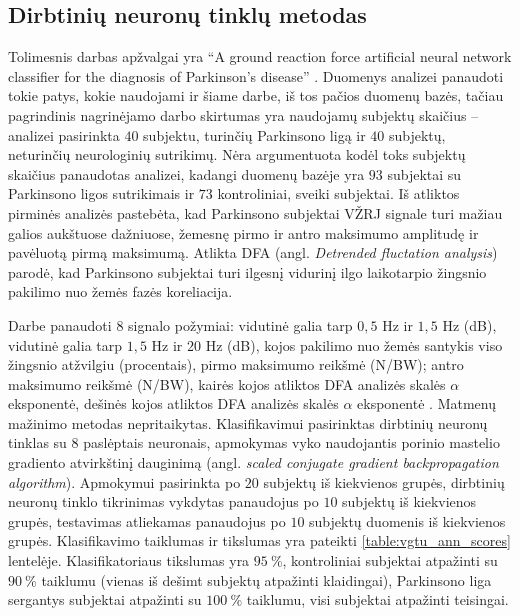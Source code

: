 \documentclass[]{vgtuef}
\begin{document}
\subsection{Dirbtinių neuronų tinklų metodas}


Tolimesnis darbas apžvalgai yra ``A ground reaction force artificial neural network classifier for the diagnosis of Parkinson's disease'' \cite{vgtu}. Duomenys analizei panaudoti tokie patys, kokie naudojami ir šiame darbe, iš tos pačios duomenų bazės, tačiau pagrindinis nagrinėjamo darbo skirtumas yra naudojamų subjektų skaičius -- analizei pasirinkta $40$ subjektu, turinčių Parkinsono ligą ir $40$ subjektų, neturinčių neurologinių sutrikimų. Nėra argumentuota kodėl toks subjektų skaičius panaudotas analizei, kadangi duomenų bazėje yra $93$ subjektai su Parkinsono ligos sutrikimais ir $73$ kontroliniai, sveiki subjektai. Iš atliktos pirminės analizės pastebėta, kad Parkinsono subjektai VŽRJ signale turi mažiau galios aukštuose dažniuose, žemesnę pirmo ir antro maksimumo amplitudę ir pavėluotą pirmą maksimumą. Atlikta DFA (angl. \textit{Detrended fluctation analysis}) parodė, kad Parkinsono subjektai turi ilgesnį vidurinį ilgo laikotarpio žingsnio pakilimo nuo žemės fazės koreliacija.

Darbe panaudoti $8$ signalo požymiai: vidutinė galia tarp $0,5$ Hz ir $1,5$ Hz (dB), vidutinė galia tarp $1,5$ Hz ir $20$ Hz (dB), kojos pakilimo nuo žemės santykis viso žingsnio atžvilgiu (procentais), pirmo maksimumo reikšmė (N/BW); antro maksimumo reikšmė (N/BW), kairės kojos atliktos DFA analizės skalės $\alpha$ eksponentė, dešinės kojos atliktos DFA analizės skalės $\alpha$ eksponentė \cite{Hausdorff01011997}. Matmenų mažinimo metodas nepritaikytas. Klasifikavimui pasirinktas dirbtinių neuronų tinklas su $8$ paslėptais neuronais, apmokymas vyko naudojantis porinio mastelio gradiento atvirkštinį dauginimą (angl. \textit{scaled conjugate gradient backpropagation algorithm}). Apmokymui pasirinkta po $20$ subjektų iš kiekvienos grupės, dirbtinių neuronų tinklo tikrinimas vykdytas panaudojus po $10$ subjektų iš kiekvienos grupės, testavimas atliekamas panaudojus po $10$ subjektų duomenis iš kiekvienos grupės. Klasifikavimo taiklumas ir tikslumas yra pateikti \ref{table:vgtu_ann_scores} lentelėje. Klasifikatoriaus tikslumas yra $95~\%$, kontroliniai subjektai atpažinti su $90~\%$ taiklumu (vienas iš dešimt subjektų atpažinti klaidingai), Parkinsono liga sergantys subjektai atpažinti su $100~\%$ taiklumu, visi subjektai atpažinti teisingai.
\end{document}
